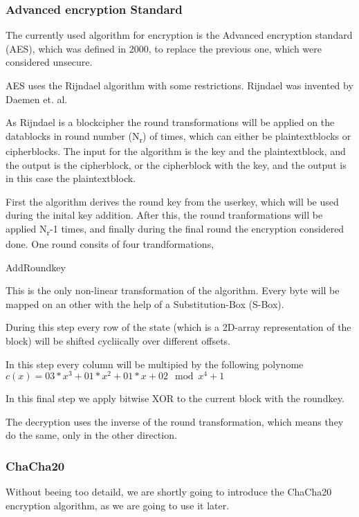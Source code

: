 \documentclass[12pt,a4paper,titlepage,oneside]{scrartcl}
\begin{document}
\subsubsection{Advanced encryption Standard}
The currently used algorithm for encryption is the Advanced encryption standard (AES), which was defined in 2000, to replace the previous one, which were considered unsecure.

AES uses the Rijndael algorithm with some restrictions.
Rijndael was invented by Daemen et. al. \cite{daemen2013design}

As Rijndael is a blockcipher the round transformations will be applied on the datablocks in round number (N\textsubscript{r}) of times, which can either be plaintextblocks or cipherblocks.
The input for the algorithm is the key and the plaintextblock, and the output is the cipherblock, or the cipherblock with the key, and the output is in this case the plaintextblock. \cite{daemen2013design}

First the algorithm derives the round key from the userkey, which will be used during the inital key addition.
After this, the round tranformations will be applied N\textsubscript{r}-1 times, and finally during the final round the encryption considered done.
One round consits of four trandformations,
\begin{labeling}{AddRoundkey}
\item [SubBytes] This is the only non-linear transformation of the algorithm. Every byte will be mapped on an other with the help of a Substitution-Box (S-Box).
\item [ShiftRows] During this step every row of the state (which is a 2D-array representation of the block) will be shifted cycliically over different offsets.
\item [MixColumns] In this step every column will be multipied by the following polynome \begin{math} c(x) = 03 * x^3 + 01 * x^2 + 01 * x + 02 \mod x^4 + 1 \end{math}
\item [AddRoundkey] In this final step we apply bitwise XOR to the current block with the roundkey.
\end{labeling}
The decryption uses the inverse of the round transformation, which means they do the same, only in the other direction. \cite{daemen2013design}

\subsubsection{ChaCha20}
Without beeing too detaild, we are shortly going to introduce the ChaCha20 encryption algorithm, as we are going to use it later.
\end{document}
